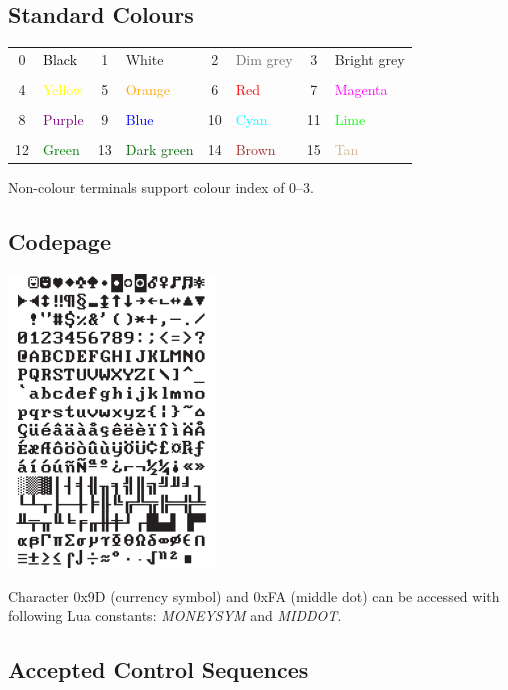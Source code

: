 \documentclass[10pt, stock]{memoir}
\begin{document}
\subsection{Standard Colours}

\begin{tabularx}{\textwidth}{c l c l c l c l}
	0 & \textcolor{black}{Black} & 1 & White & 2 & \textcolor{dimgrey}{Dim grey} & 3 & \textcolor{brightgrey}{Bright grey}
	\\ \\
	4 & \textcolor{yellow}{Yellow} & 5 & \textcolor{orange}{Orange} & 6 & \textcolor{red}{Red} & 7 & \textcolor{magenta}{Magenta}
	\\ \\
	8 & \textcolor{purple}{Purple} & 9 & \textcolor{blue}{Blue} & 10 & \textcolor{cyan}{Cyan} & 11 & \textcolor{lime}{Lime}
	\\ \\
	12 & \textcolor{green}{Green} & 13 & \textcolor{darkgreen}{Dark green} & 14 & \textcolor{brown}{Brown} & 15 & \textcolor{tan}{Tan}
\end{tabularx}

Non-colour terminals support colour index of 0--3.

\subsection{Codepage}

{\center\includegraphics[height=21em]{mda.pdf}}

Character 0x9D (currency symbol) and 0xFA (middle dot) can be accessed with following Lua constants: \emph{MONEYSYM} and \emph{MIDDOT}.

\subsection{Accepted Control Sequences}
\end{document}
